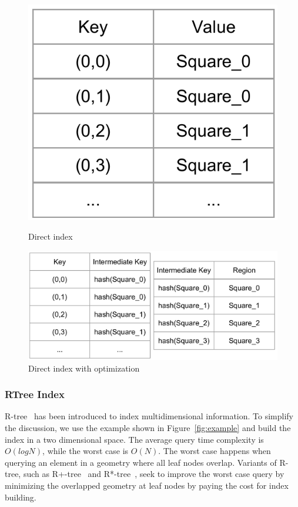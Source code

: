 \documentclass{sig-alternate}
\begin{document}
\begin{figure}
\centering
\begin{minipage}{.3\linewidth}
  \includegraphics[width=\linewidth]{pictures/direct}
  \caption{Direct index}
  \label{fig:direct}
\end{minipage}
\hspace{.05\linewidth}
\begin{minipage}{.6\linewidth}
  \includegraphics[width=\linewidth]{pictures/direct-optimized}
  \caption{Direct index with optimization}
  \label{fig:direct-optimized}
\end{minipage}
\end{figure}


\subsubsection{RTree Index}
R-tree~\cite{guttman1984} has been introduced to index multidimensional information.
To simplify the discussion, we use the example shown in Figure~\ref{fig:example} and build the index in a two dimensional space.
The average query time complexity is $O(logN)$, while the worst case is $O(N)$. 
The worst case happens when querying an element in a geometry where all leaf nodes overlap.
Variants of R-tree, such as R+-tree~\cite{sellis1987} and R*-tree~\cite{beckmann1990}, 
seek to improve the worst case query by minimizing the overlapped geometry at leaf nodes 
by paying the cost for index building.
\end{document}
